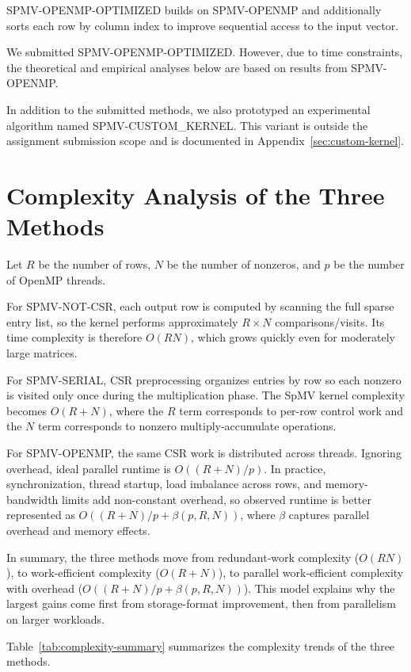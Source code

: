 \documentclass{article}
\begin{document}
SPMV-OPENMP-OPTIMIZED builds on SPMV-OPENMP and additionally sorts each row by column index to improve sequential access to the input vector.

We submitted SPMV-OPENMP-OPTIMIZED. However, due to time constraints, the theoretical and empirical analyses below are based on results from SPMV-OPENMP.

In addition to the submitted methods, we also prototyped an experimental algorithm named SPMV-CUSTOM\_KERNEL. This variant is outside the assignment submission scope and is documented in Appendix~\ref{sec:custom-kernel}.



\section{Complexity Analysis of the Three Methods}

Let $R$ be the number of rows, $N$ be the number of nonzeros, and $p$ be the number of OpenMP threads.

For SPMV-NOT-CSR, each output row is computed by scanning the full sparse entry list, so the kernel performs approximately $R \times N$ comparisons/visits. Its time complexity is therefore $O(RN)$, which grows quickly even for moderately large matrices.

For SPMV-SERIAL, CSR preprocessing organizes entries by row so each nonzero is visited only once during the multiplication phase. The SpMV kernel complexity becomes $O(R + N)$, where the $R$ term corresponds to per-row control work and the $N$ term corresponds to nonzero multiply-accumulate operations.

For SPMV-OPENMP, the same CSR work is distributed across threads. Ignoring overhead, ideal parallel runtime is $O((R + N)/p)$. In practice, synchronization, thread startup, load imbalance across rows, and memory-bandwidth limits add non-constant overhead, so observed runtime is better represented as $O((R + N)/p + \beta(p, R, N))$, where $\beta$ captures parallel overhead and memory effects.

In summary, the three methods move from redundant-work complexity ($O(RN)$), to work-efficient complexity ($O(R+N)$), to parallel work-efficient complexity with overhead ($O((R+N)/p + \beta(p, R, N))$). This model explains why the largest gains come first from storage-format improvement, then from parallelism on larger workloads.

Table~\ref{tab:complexity-summary} summarizes the complexity trends of the three methods.
\end{document}
